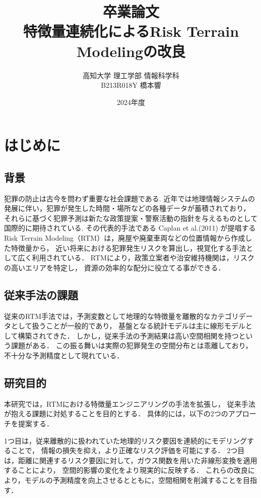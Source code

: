 \documentclass[12pt,a4paper,oneside]{jsbook}
\title{
卒業論文\\[1.5cm]
特徴量連続化によるRisk Terrain Modelingの改良\\[6cm]
}
\author{高知大学 理工学部 情報科学科\\[0.5cm]
B213R018Y 橋本響}
\date{2024年度}
\theoremstyle{plain}
\begin{document}
\maketitle
\tableofcontents

\chapter{はじめに}
\label{chapter_1}
\section{背景}
犯罪の防止は古今を問わず重要な社会課題である.
近年では地理情報システムの発展に伴い，犯罪が発生した時間・場所などの各種データが蓄積されており，
それらに基づく犯罪予測は新たな政策提案・警察活動の指針を与えるものとして国際的に期待されている.
その代表的手法である
Caplan et al.(2011)\cite{caplan2011}
が提唱するRisk Terrain Modeling（RTM）は，廃屋や廃棄車両などの位置情報から作成した特徴量から，
近い将来における犯罪発生リスクを算出し，視覚化する手法として広く利用されている．
RTMにより，政策立案者や治安維持機関は，リスクの高いエリアを特定し，
資源の効率的な配分に役立てる事ができる．

\section{従来手法の課題}
従来のRTM手法では，予測変数として地理的な特徴量を離散的なカテゴリデータとして扱うことが一般的であり，
基盤となる統計モデルは主に線形モデルとして構築されてきた．
しかし，従来手法の予測結果は高い空間相関を持つという課題がある．
この振る舞いは実際の犯罪発生の空間分布とは乖離しており，不十分な予測精度として現れている．

\section{研究目的}
本研究では，RTMにおける特徴量エンジニアリングの手法を拡張し，
従来手法が抱える課題に対処することを目的とする．
具体的には，以下の2つのアプローチを提案する．

1つ目は，従来離散的に扱われていた地理的リスク要因を連続的にモデリングすることで，
情報の損失を抑え，より正確なリスク評価を可能にする． 
2つ目は，距離に関連するリスク要因に対して，ガウス関数を用いた非線形変換を適用することにより，
空間的影響の変化をより現実的に反映する．
これらの改良により，モデルの予測精度を向上させるとともに，空間相関を削減することを目指す．
\end{document}
